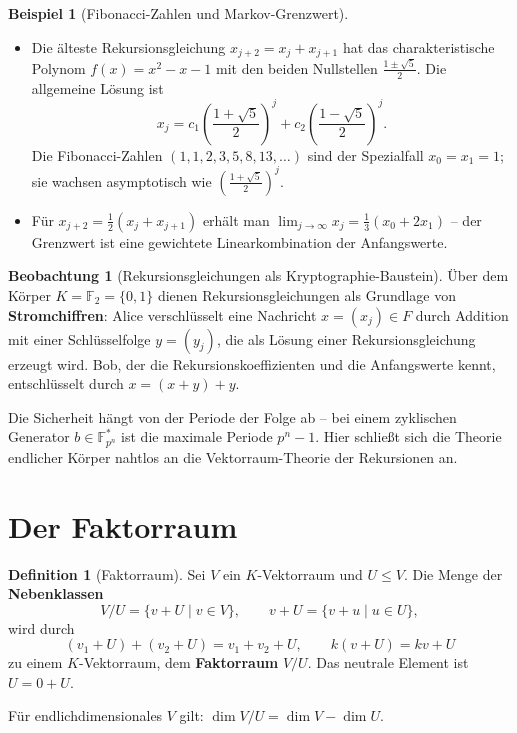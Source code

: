 ﻿\documentclass[a4paper,12pt]{report}
\theoremstyle{definition}
\newtheorem{definition}{Definition}
\newtheorem{beispiel}{Beispiel}
\newtheorem{beobachtung}{Beobachtung}
\begin{document}
\begin{beispiel}[Fibonacci-Zahlen und Markov-Grenzwert]
    \begin{itemize}
        \item[-] Die älteste Rekursionsgleichung $x_{j+2} = x_j + x_{j+1}$
              hat das charakteristische Polynom $f(x) = x^2 - x - 1$ mit
              den beiden Nullstellen $\frac{1 \pm \sqrt{5}}{2}$. Die allgemeine
              Lösung ist
              \[
                  x_j = c_1 \left(\frac{1+\sqrt{5}}{2}\right)^j
                  + c_2 \left(\frac{1-\sqrt{5}}{2}\right)^j.
              \]
              Die Fibonacci-Zahlen $(1, 1, 2, 3, 5, 8, 13, \dots)$ sind
              der Spezialfall $x_0 = x_1 = 1$; sie wachsen asymptotisch
              wie $\left(\frac{1+\sqrt{5}}{2}\right)^j$.
        \item[-] Für $x_{j+2} = \frac{1}{2}(x_j + x_{j+1})$ erhält man
              $\lim_{j\to\infty} x_j = \frac{1}{3}(x_0 + 2x_1)$ -- der
              Grenzwert ist eine gewichtete Linearkombination der Anfangswerte.
    \end{itemize}
\end{beispiel}

\begin{beobachtung}[Rekursionsgleichungen als Kryptographie-Baustein]
    Über dem Körper $K = \mathbb{F}_2 = \{0, 1\}$ dienen Rekursionsgleichungen
    als Grundlage von \textbf{Stromchiffren}: Alice verschlüsselt eine
    Nachricht $x = (x_j) \in F$ durch Addition mit einer Schlüsselfolge
    $y = (y_j)$, die als Lösung einer Rekursionsgleichung erzeugt wird.
    Bob, der die Rekursionskoeffizienten und die Anfangswerte kennt,
    entschlüsselt durch $x = (x + y) + y$.

    Die Sicherheit hängt von der Periode der Folge ab -- bei einem
    zyklischen Generator $b \in \mathbb{F}_{p^n}^*$ ist die maximale
    Periode $p^n - 1$. Hier schließt sich die Theorie endlicher Körper
    nahtlos an die Vektorraum-Theorie der Rekursionen an.
\end{beobachtung}

\section{Der Faktorraum}

\begin{definition}[Faktorraum]
    Sei $V$ ein $K$-Vektorraum und $U \leq V$. Die Menge der
    \textbf{Nebenklassen}
    \[
        V/U = \{v + U \mid v \in V\}, \qquad v + U = \{v + u \mid u \in U\},
    \]
    wird durch
    \[
        (v_1 + U) + (v_2 + U) = v_1 + v_2 + U, \qquad k(v + U) = kv + U
    \]
    zu einem $K$-Vektorraum, dem \textbf{Faktorraum} $V/U$. Das neutrale
    Element ist $U = 0 + U$.

    Für endlichdimensionales $V$ gilt: $\dim V/U = \dim V - \dim U$.
\end{definition}
\end{document}
